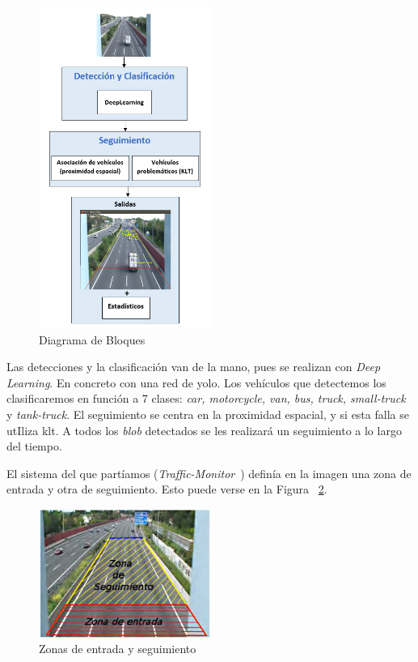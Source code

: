 \begin{figure}[H]
\begin{center}
	\includegraphics[width=0.5\textwidth]{figures/Diseno_global/diagrama_bloques.PNG}
   \caption{Diagrama de Bloques}
	\label{fig.diagrama_bloques}
\end{center}
\end{figure}

Las detecciones y la clasificación van de la mano, pues se realizan con \textit{Deep Learning}. En concreto con una red de \acrshort{yolo}. Los vehículos que detectemos los clasificaremos en función a 7 clases:  \textit{car, motorcycle, van, bus, truck, small-truck} y \textit{tank-truck}. 
El seguimiento se centra en la proximidad espacial, y si esta falla se utIliza \acrshort{klt}. A todos los \textit{blob} detectados se les realizará un seguimiento a lo largo del tiempo. 

El sistema del que partíamos (\textit{Traffic-Monitor}~\cite{traffic_monitor_redo}) definía en la imagen una zona de entrada y otra de seguimiento. Esto puede verse en la Figura ~\ref{fig.zonas}.

\begin{figure}[H] 
\begin{center}
	\includegraphics[width=0.5\textwidth]{figures/Diseno_global/zonas.jpg}
   \caption{Zonas de entrada y seguimiento}
	\label{fig.zonas}
\end{center}
\end{figure}


